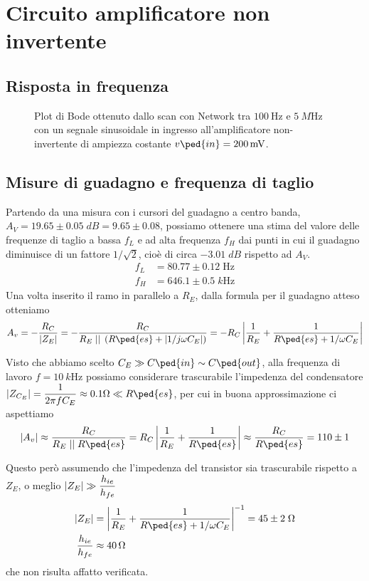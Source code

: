 \documentclass[10pt,a4paper]{article}
\begin{document}
\section{Circuito amplificatore non invertente}
\subsection{Risposta in frequenza}
\begin{figure}[htbp]
\centering
\caption{Plot di Bode ottenuto dallo scan con Network tra $\SI{100}{\Hz}$ e
$\SI{5}{M\Hz}$ con un segnale sinusoidale in ingresso all'amplificatore
non-invertente di ampiezza costante $v\ped{in} = \SI{200}{m\V}$.
\label{fig: ampbode}}
\end{figure}

\subsection{Misure di guadagno e frequenza di taglio}
Partendo da una misura con i cursori del guadagno a centro banda,
$A_V = 19.65 \pm 0.05 \; \si{dB} = 9.65 \pm 0.08$, possiamo ottenere una stima del valore
delle frequenze di taglio a bassa $f_L$ e ad alta frequenza $f_H$ dai punti
in cui il guadagno diminuisce di un fattore $1/\sqrt{2}$, cioè di circa
$-3.01 \; \si{dB}$ rispetto ad $A_V$.
\begin{align*}
f_L &= 80.77 \pm 0.12 \; \si{\Hz}\\
f_H &= 646.1 \pm 0.5 \; \si{k\Hz}
\end{align*}
\iffalse
Una volta inserito il ramo in parallelo a $R_E$, dalla formula per il guadagno
atteso otteniamo
\[
A_v = -\frac{R_C}{\abs{Z_E}} =
- \frac{R_C}{R_E \; \lvert \rvert \; \left(R\ped{es} + \abs{1/j\omega C_E}
\right)} =
- R_C \abs{\frac{1}{R_E} + \frac{1}{R\ped{es} + 1/\omega C_E}}
\]

Visto che abbiamo scelto $C_E \gg C\ped{in} \sim C\ped{out}$, alla frequenza
di lavoro $f = \SI{10}{k\Hz}$ possiamo considerare trascurabile l'impedenza
del condensatore $\abs{Z_{C_E}} = \dfrac{1}{2\pi f C_E} \approx 0.1 \si{\ohm}
\ll R\ped{es}$, per cui in buona approssimazione ci aspettiamo
\[
\abs{A_v} \approx
\frac{R_C}{R_E \; \lvert \rvert \; R\ped{es}} =
R_C \abs{\frac{1}{R_E} + \frac{1}{R\ped{es}}} \approx
\frac{R_C}{R\ped{es}} = 110 \pm 1
\]

Questo però assumendo che l'impedenza del transistor sia trascurabile rispetto
a $Z_E$, o meglio $\left| Z_E \right| \gg \dfrac{h_{ie}}{h_{fe}}$
\begin{align*}
\abs{Z_E} &= \abs{\frac{1}{R_E} + \frac{1}{R\ped{es} + 1/\omega C_E}}^{-1} =
45 \pm 2 \; \si{\ohm} \\
\frac{h_{ie}}{h_{fe}} &\approx \SI{40}{\ohm}
\end{align*}
che non risulta affatto verificata.
\end{document}
